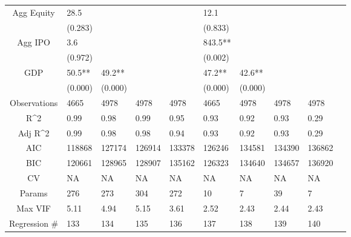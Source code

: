 \documentclass{article}
\begin{document}
\begin{table}[H]
\begin{tabular}{|clllllllll|}
  Agg Equity & 28.5 &  &  &  & 12.1 &  &  &  & \\ 
   & (0.283) &  &  &  & (0.833) &  &  &  & \\ 
  Agg IPO & 3.6 &  &  &  & 843.5** &  &  &  & \\ 
   & (0.972) &  &  &  & (0.002) &  &  &  & \\ 
  GDP & 50.5** & 49.2** &  &  & 47.2** & 42.6** &  &  & \\ 
   & (0.000) & (0.000) &  &  & (0.000) & (0.000) &  &  & \\ 
  \hline 
 Observations & 4665 & 4978 & 4978 & 4978 & 4665 & 4978 & 4978 & 4978 & \\ 
  R^2 & 0.99 & 0.98 & 0.99 & 0.95 & 0.93 & 0.92 & 0.93 & 0.29 & \\ 
  Adj R^2 & 0.99 & 0.98 & 0.98 & 0.94 & 0.93 & 0.92 & 0.93 & 0.29 & \\ 
  AIC & 118868 & 127174 & 126914 & 133378 & 126246 & 134581 & 134390 & 136862 & \\ 
  BIC & 120661 & 128965 & 128907 & 135162 & 126323 & 134640 & 134657 & 136920 & \\ 
  CV & NA & NA & NA & NA & NA & NA & NA & NA & \\ 
  Params & 276 & 273 & 304 & 272 & 10 & 7 & 39 & 7 & \\ 
  Max VIF & 5.11 & 4.94 & 5.15 & 3.61 & 2.52 & 2.43 & 2.44 & 2.43 & \\ 
  Regression \# & 133 & 134 & 135 & 136 & 137 & 138 & 139 & 140 & \\ 
   \hline
\end{tabular}
 
\end{table}
\end{document}

